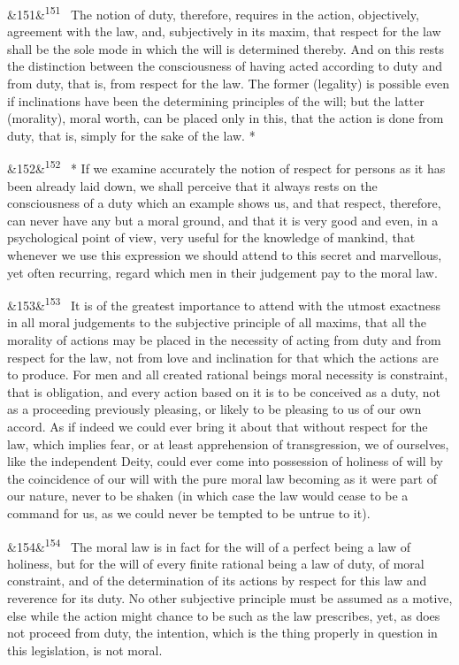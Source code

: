 \documentclass[12pt]{article}
\newcommand{\para}[1][]{\par\noindent\ifx&#1&\else\textsuperscript{\footnotesize #1}~\fi}
\begin{document}
\para[151] The notion of duty, therefore, requires in the action, objectively, agreement with the law, and, subjectively in its maxim, that respect for the law shall be the sole mode in which the will is determined thereby. And on this rests the distinction between the consciousness of having acted according to duty and from duty, that is, from respect for the law. The former (legality) is possible even if inclinations have been the determining principles of the will; but the latter (morality), moral worth, can be placed only in this, that the action is done from duty, that is, simply for the sake of the law. *

\para[152] * If we examine accurately the notion of respect for persons as it has been already laid down, we shall perceive that it always rests on the consciousness of a duty which an example shows us, and that respect, therefore, can never have any but a moral ground, and that it is very good and even, in a psychological point of view, very useful for the knowledge of mankind, that whenever we use this expression we should attend to this secret and marvellous, yet often recurring, regard which men in their judgement pay to the moral law.

\para[153] It is of the greatest importance to attend with the utmost exactness in all moral judgements to the subjective principle of all maxims, that all the morality of actions may be placed in the necessity of acting from duty and from respect for the law, not from love and inclination for that which the actions are to produce. For men and all created rational beings moral necessity is constraint, that is obligation, and every action based on it is to be conceived as a duty, not as a proceeding previously pleasing, or likely to be pleasing to us of our own accord. As if indeed we could ever bring it about that without respect for the law, which implies fear, or at least apprehension of transgression, we of ourselves, like the independent Deity, could ever come into possession of holiness of will by the coincidence of our will with the pure moral law becoming as it were part of our nature, never to be shaken (in which case the law would cease to be a command for us, as we could never be tempted to be untrue to it).

\para[154] The moral law is in fact for the will of a perfect being a law of holiness, but for the will of every finite rational being a law of duty, of moral constraint, and of the determination of its actions by respect for this law and reverence for its duty. No other subjective principle must be assumed as a motive, else while the action might chance to be such as the law prescribes, yet, as does not proceed from duty, the intention, which is the thing properly in question in this legislation, is not moral.
\end{document}
